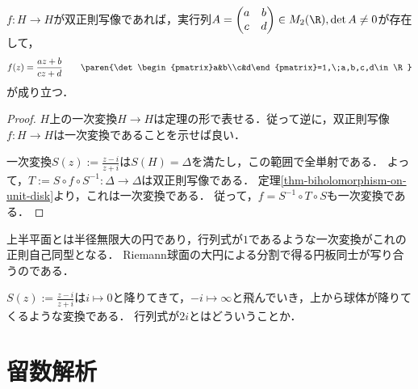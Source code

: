 \documentclass[uplatex, dvipdfmx]{jsreport}
\begin{document}
\begin{theorem}[上半空間の自己同型]
    $f:H\to H$が双正則写像であれば，実行列$A=\begin{pmatrix}a&b\\c&d\end{pmatrix}\in M_2(\R),\det A\ne 0$が存在して，
    \[f(z)=\frac{az+b}{cz+d}\qquad\paren{\det\begin{pmatrix}a&b\\c&d\end{pmatrix}=1,\;a,b,c,d\in\R}\]
    が成り立つ．
\end{theorem}
\begin{proof}
    $H$上の一次変換$H\to H$は定理の形で表せる．従って逆に，双正則写像$f:H\to H$は一次変換であることを示せば良い．

    一次変換$S(z):=\frac{z-i}{z+i}$は$S(H)=\Delta$を満たし，この範囲で全単射である．
    よって，$T:=S\circ f\circ S^{-1}:\Delta\to\Delta$は双正則写像である．
    定理\ref{thm-biholomorphism-on-unit-disk}より，これは一次変換である．
    従って，$f=S^{-1}\circ T\circ S$も一次変換である．
\end{proof}
\begin{remarks}
    上半平面とは半径無限大の円であり，行列式が$1$であるような一次変換がこれの正則自己同型となる．
    Riemann球面の大円による分割で得る円板同士が写り合うのである．

    $S(z):=\frac{z-i}{z+i}$は$i\mapsto 0$と降りてきて，$-i\mapsto\infty$と飛んでいき，上から球体が降りてくるような変換である．
    行列式が$2i$とはどういうことか．
\end{remarks}

\chapter{留数解析}
\end{document}
